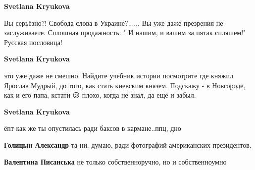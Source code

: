 \begin{itemize}
\begin{itemize}
 
\textbf{Svetlana Kryukova} 

Вы серьёзно?! Свобода слова в Украине?...... Вы уже даже презрения не
заслуживаете. Сплошная продажность. " И нашим, и вашим за пятак спляшем!"
Русская пословица!


 
\textbf{Svetlana Kryukova} 

это уже даже не смешно. Найдите учебник истории посмотрите где княжил Ярослав
Мудрый, до того, как стать киевским князем. Подскажу - в Новгороде, как и его
папа, кстати 😕 плохо, когда не знал, да ещё и забыл.


 
\textbf{Svetlana Kryukova} 

ёпт как же ты опустилась ради баксов в кармане..ппц, дно

 
\textbf{Голицын Александр} та ни. думаю, ради фотографий американских президентов.

 
\textbf{Валентина Писанська} не только собственноручно, но и собственноумно

 

\end{itemize}
\end{itemize}
